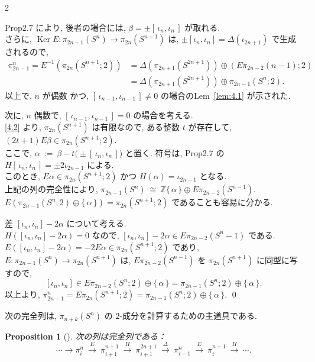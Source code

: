 \documentclass[10pt, leqno]{ltjsarticle}
\newcommand{\Ex}{E}        %
\newcommand{\gen}[1]{\{\,#1\,\}}       %
\newcommand{\Ker}{\operatorname{Ker}}
\newcommand{\pis}[2]{\pi_{#1}(#2)}       %
\newcommand{\pit}[2]{\pi_{#1}^{#2}}
\numberwithin{equation}{section}
\theoremstyle{plain}
\newtheorem{proposition}[theorem]{Proposition}
\theoremstyle{definition}
\theoremstyle{remark}
\begin{document}
\begin{paracol}{2}

\noindent
Prop2.7 により, 後者の場合には,
$\beta=\pm[\,\iota_n,\iota_n\,]$ が取れる. \\
さらに, $\Ker \Ex:\pis{2n-1}{S^{n}}\to\pis{2n}{S^{n+1}}$ は,
\(\pm[\iota_n, \iota_n]=\Delta(\iota_{2n+1})\) で生成されるので, 
\[
\begin{align*}
  \pit{2n-1}{n} = E^{-1}(\pis{2n}{S^{n+1}; 2})
  &= \Delta(\pis{2n+1}{S^{2n+1}}) \oplus (E \pis{2n-2}{n-1}; 2) \\
  &= \Delta(\pis{2n+1}{S^{2n+1}}) \oplus \pis{2n-1}{S^n;2} .
\end{align*}
\]
以上で, $n$ が偶数 かつ, 
$[\,\iota_{n-1},\iota_{n-1}\,]\ne0$ の場合のLem~\ref{lem:4.1} が示された. 

次に, $n$ 偶数で,
$[\,\iota_{n-1},\iota_{n-1}\,]=0$ の場合を考える. \\
\eqref{4.2} より, $\pis{2n}{S^{n+1}}$ は有限なので, 
ある整数 $t$ が存在して,
\((2t+1)E\beta\in\pis{2n}{S^{n+1};2}\). \\
ここで, 
\(
\alpha\ :=\ \beta- t \bigl(\pm[\,\iota_n,\iota_n\,]\bigr)
\)
と置く. 
符号は, Prop2.7 の $H[\,\iota_n,\iota_n\,]=\pm2\iota_{2n-1}$ による. \\
このとき, 
$E\alpha\in \pis{2n}{S^{n+1};2}$ かつ $H(\alpha)=\iota_{2n-1}$ となる. \\
上記の列の完全性により, 
\(
\pis{2n-1}{S^{n}}\ \cong\
\mathbb{Z}\gen{\alpha} \oplus E\pis{2n-2}{S^{n-1}} .
\)\\
$\Ex(\pis{2n-1}{S^n;2} \oplus \gen{\alpha}) = \pis{2n}{S^{n+1};2}$ 
であることも容易に分かる. 

差 \([\iota_n, \iota_n]-2\alpha\) について考える. \\
\(H([\iota_n, \iota_n] - 2\alpha) = 0\) なので, 
\([\iota_n, \iota_n] - 2\alpha \in E \pis{2n-2}{S^n-1}\) である. \\
\(E([\iota_n, \iota_n] - 2\alpha) = -2E\alpha \in \pis{2n}{S^{n+1}; 2}\)
であり, \\
\(E:\pis{2n-1}{S^n}\to\pis{2n}{S^{n+1}}\)
は, 
\(E\pis{2n-2}{S^{n-1}}\)
を 
\(\pis{2n}{S^{n+1}}\)
に同型に写すので, 
\[
[\iota_n, \iota_n] \in E\pis{2n-2}{S^n; 2} \oplus \gen{\alpha}
= \pis{2n-1}{S^n; 2} \oplus \gen{\alpha} .
\]
以上より, 
\(
\pit{2n-1}{n} = E\pis{2n}{S^{n+1}; 2}
= \pis{2n-1}{S^n; 2} \oplus \gen{\alpha} .
\)
\qed

次の完全列は, \(\pis{n+k}{S^n}\) の $2$-成分を計算するための主道具である. 
\begin{proposition}[]\label{prop:4.2}
次の列は完全列である：
\begin{equation}\label{4.4}
\cdots \longrightarrow
\pit{i}{n}\ \xrightarrow{\ \Ex\ }\ \pit{i+1}{n+1}\
\xrightarrow{\ H\ }\ \pit{i+1}{2n+1}\
\xrightarrow{\ \Delta\ }\ \pit{i-1}{n}\
\xrightarrow{\ \Ex\ }\ \pit{i}{n+1}\ \xrightarrow{\ H\ }\ \cdots.
\end{equation}
\end{proposition}


\end{paracol}
\end{document}

